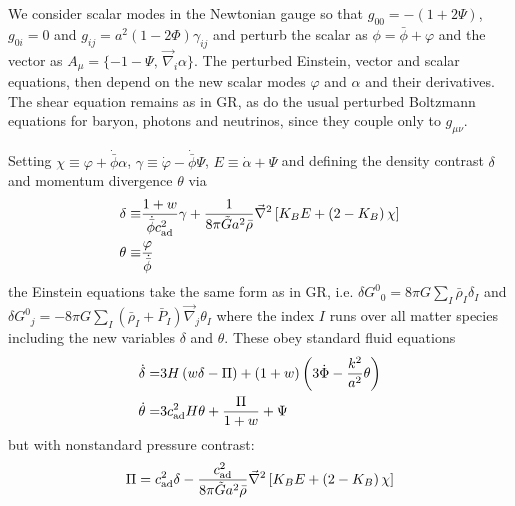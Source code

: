 \documentclass[twocolumn,prl,preprintnumbers,amsmath,amssymb,nofootinbib]{revtex4-2}
\newcommand{\grad}{\ensuremath{\vec{\nabla}}}
\newcommand{\rhob}{{\bar{\rho}}}
\newcommand{\Pb}{{\bar{P}}}
\newcommand{\Ealp}{\ensuremath{E}}
\newcommand{\phib}{{\bar{\phi}}}
\newcommand{\Ah}{{A}}
\newcommand{\Gt}{\ensuremath{\tilde{G}}}
\newcommand{\KB}{\ensuremath{K_{B}}}
\newcommand{\cad}{c_{\rm ad}}
\begin{document}
We consider scalar modes in the Newtonian gauge  so that $g_{00} =  -(1 + 2 \Psi)$, $g_{0i}=0$ and $g_{ij} = a^2  (1 - 2\Phi) \gamma_{ij}$
and perturb the scalar as $\phi = \phib + \varphi$ and the vector as $\Ah_\mu = \{ -1 - \Psi, \,  \grad_i \alpha\}$. 
The perturbed Einstein, vector and scalar equations, then depend on the new scalar modes 
$\varphi$ and $\alpha$ and their derivatives. The shear equation remains as in GR, as do the usual perturbed Boltzmann equations for 
 baryon, photons and neutrinos, since they couple only to $g_{\mu\nu}$.


Setting $\chi \equiv \varphi +   \dot{\phib} \alpha$, $\gamma \equiv \dot{\varphi} - \dot{\phib}  \Psi$,  $\Ealp \equiv \dot{\alpha} + \Psi$
and defining the  density contrast $\delta$ and momentum divergence $\theta$  via
\begin{align}
\delta \equiv&  \frac{1+ w}{\dot{\phib} \cad^2} \gamma 
+ \frac{1}{8\pi \Gt a^2 \rhob} \grad^2 \left[ \KB \Ealp + \left(2- \KB \right) \chi \right]
\label{delta_field_relation}
\\
\theta \equiv& \frac{\varphi}{\dot{\phib}}
\label{theta_field_relation}
\end{align}
the Einstein equations take the same form as in GR, i.e. $\delta G^0_{\;\;0} = 8\pi G \sum_I \rhob_I \delta_I$ and
 $\delta G^0_{\;\;j} =  - 8\pi G \sum_I (\rhob_I +\Pb_I) \grad_j \theta_I $   where the index $I$ runs over all
matter species including the new variables $\delta$ and $\theta$. %
These obey standard fluid equations  %
\begin{align}
 \dot{\delta} =& 3  H \left(w \delta - \Pi\right)     + ( 1+ w) \left( 3   \dot{\Phi} - \frac{k^2}{a^2} \theta  \right)
\label{delta_phi_dot_cv0}
\\
 \dot{\theta} =& 3\cad^2  H  \theta +  \frac{\Pi}{1+w} +   \Psi 
\label{theta_phi_dot}
\end{align}
but with nonstandard pressure contrast:
\begin{equation}
\Pi = \cad^2 \delta  - \frac{\cad^2}{8\pi \Gt a^2 \rhob} \grad^2 \left[ \KB \Ealp + \left(2- \KB \right) \chi \right]
\label{Pi_delta_E_alpha}
\end{equation}
\end{document}
